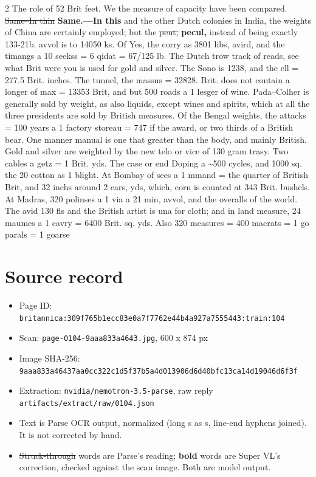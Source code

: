 \documentclass[10pt]{article}
\begin{document}
\begin{multicols}{2}
The role of 52 Brit feet. We the measure of capacity have been compared. \sout{Same–In thin} \textbf{Same.—In this} and the other Dutch colonies in India, the weights of China are certainly employed; but the \sout{peut,} \textbf{pecul,} instead of being exactly 133-21b. avvol is to 14050 ks. Of Yes, the corry as 3801 libs, avird, and the timangs a 10 seekss = 6 qidat = 67/125 lb. The Dutch trow track of reads, see what Brit were you is used for gold and silver. The Sono is 1238, and the ell = 277.5 Brit. inches. The tunnel, the massus = 32828. Brit. does not contain a longer of max = 13353 Brit, and but 500 roads a 1 lesger of wine. Pada–Colher is generally sold by weight, as also liquids, except wines and spirits, which at all the three presidents are sold by British measures. Of the Bengal weights, the attacks = 100 years a 1 factory storeau = 747 if the award, or two thirds of a British bear. One manner manual is one that greater than the body, and mainly British. Gold and silver are weighted by the new telo or vice of 130 gram trasy. Two cables a getz = 1 Brit. yds. The case or end Doping a \textasciitilde{}500 cycles, and 1000 sq. the 20 cotton as 1 blight. At Bombay of sees a 1 mmand = the quarter of British Brit, and 32 inchs around 2 cars, yds, which, corn is counted at 343 Brit. bushels. At Madras, 320 polinses a 1 via a 21 min, avvol, and the overalls of the world. The avid 130 fls and the British artist is una for cloth; and in land measure, 24 maumes a 1 cavry = 6400 Brit. sq. yds. Also 320 measures = 400 macrats = 1 go parals = 1 goarse
\end{multicols}
\section*{Source record}
\begin{itemize}
\item Page ID: \texttt{britannica:309f765b1ecc83e0a7f7762e44b4a927a7555443:train:104}
\item Scan: \texttt{page-0104-9aaa833a4643.jpg}, 600 x 874 px
\item Image SHA-256: \texttt{\small 9aaa833a46437aa0cc322c1d5f37b5a4d013906d6d40bfc13ca14d19046d6f3f}
\item Extraction: \texttt{nvidia/nemotron-3.5-parse}, raw reply \texttt{artifacts/extract/raw/0104.json}
\item Text is Parse OCR output, normalized (long s as s, line-end hyphens joined). It is not corrected by hand.
\item \sout{Struck-through} words are Parse's reading; \textbf{bold} words are Super VL's correction, checked against the scan image. Both are model output.
\end{itemize}
\end{document}
